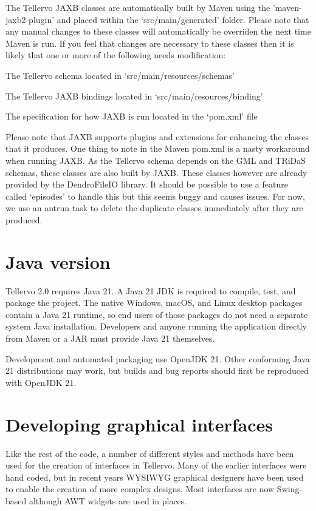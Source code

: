 The Tellervo JAXB classes are automatically built by Maven using the 'maven-jaxb2-plugin' and placed within the `src/main/generated' folder.  Please note that any manual changes to these classes will automatically be overriden the next time Maven is run.  If you feel that changes are necessary to these classes then it is likely that one or more of the following needs modification:

\begin{itemize*}
 \item The Tellervo schema located in `src/main/resources/schemas'
 \item The Tellervo JAXB bindings located in `src/main/resources/binding'
 \item The specification for how JAXB is run located in the `pom.xml' file
\end{itemize*}

Please note that JAXB supports plugins and extensions for enhancing the classes that it produces.  One thing to note in the Maven pom.xml is a nasty workaround when running JAXB.  As the Tellervo schema depends on the GML and TRiDaS schemas, these classes are also built by JAXB.  These classes however are already provided by the DendroFileIO library.  It should be possible to use a feature called `episodes' to handle this but this seems buggy and causes issues.  For now, we use an antrun task to delete the duplicate classes immediately after they are produced.


\section{Java version}
\label{txt:java}
Tellervo 2.0 requires Java 21. A Java 21 JDK is required to compile, test, and
package the project. The native Windows, macOS, and Linux desktop packages
contain a Java 21 runtime, so end users of those packages do not need a separate
system Java installation. Developers and anyone running the application
directly from Maven or a JAR must provide Java 21 themselves.

Development and automated packaging use OpenJDK 21. Other conforming Java 21
distributions may work, but builds and bug reports should first be reproduced
with OpenJDK 21.


\section{Developing graphical interfaces}
Like the rest of the code, a number of different styles and methods have been used for the creation of interfaces in Tellervo.  Many of the earlier interfaces were hand coded, but in recent years WYSIWYG graphical designers have been used to enable the creation of more complex designs.  Most interfaces are now Swing-based although AWT widgets are used in places.

